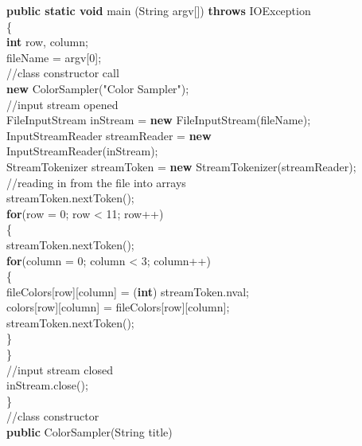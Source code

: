 \documentclass[12pt]{article}
\begin{document}
\begin{flushleft}
{\qquad		\textbf{public static void} main (String argv[]) \textbf{throws} IOException\\
\qquad		\{\\
\qquad \qquad			\textbf{int} row, column;\\
\qquad \qquad				fileName = argv[0];\\
							[2mm]
\qquad \qquad				//class constructor call\\
\qquad \qquad				\textbf{new} ColorSampler("Color Sampler");\\
							[2mm]
\qquad \qquad				//input stream opened\\
\qquad \qquad				FileInputStream inStream = \textbf{new} FileInputStream(fileName);\\
\qquad \qquad				InputStreamReader streamReader = \textbf{new}\\ \qquad \qquad \qquad \qquad \qquad \qquad \qquad \qquad \qquad \qquad InputStreamReader(inStream);\\
\qquad \qquad				StreamTokenizer streamToken = \textbf{new} StreamTokenizer(streamReader);\\
						[2mm]
\qquad \qquad			//reading in from the file into arrays\\
\qquad \qquad			streamToken.nextToken();\\
\qquad \qquad			\textbf{for}(row = 0; row < 11; row++)\\
\qquad \qquad			\{\\
\qquad \qquad \qquad				streamToken.nextToken();\\
\qquad \qquad \qquad				\textbf{for}(column = 0; column < 3; column++)\\
\qquad \qquad \qquad				\{\\
\qquad \qquad \qquad \qquad					fileColors[row][column] = (\textbf{int}) streamToken.nval;\\
\qquad \qquad \qquad \qquad					colors[row][column] = fileColors[row][column];\\
\qquad \qquad \qquad \qquad						streamToken.nextToken();\\
\qquad \qquad \qquad				\}\\
\qquad \qquad			\}\\ 
			[2mm]
\qquad \qquad			//input stream closed\\
\qquad \qquad			inStream.close();\\
\qquad \qquad		\}\\
					[2mm]
\qquad \qquad		//class constructor\\
\qquad \qquad		\textbf{public} ColorSampler(String title)\\ 
}
\end{flushleft}
\end{document}
